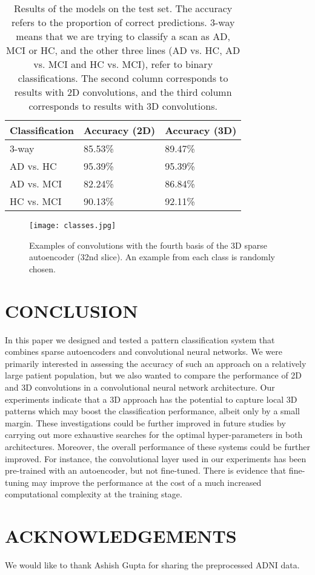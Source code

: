 \documentclass[a4paper,10pt]{article}
\begin{document}
\begin{table}[h]
\caption{Results of the models on the test set. The accuracy refers to the proportion of correct predictions. 3-way means that we are trying to classify a scan as AD, MCI or HC, and the other three lines (AD vs. HC, AD vs. MCI and HC vs. MCI), refer to binary classifications. The second column corresponds to results with 2D convolutions, and the third column corresponds to results with 3D convolutions.}
\label{tab:results} \centering
\begin{tabular}{l l l}
	\textbf{Classification} & \textbf{Accuracy (2D)} & \textbf{Accuracy (3D)} \\ \hline
	3-way & 85.53\% & 89.47\% \\
	AD vs. HC & 95.39\% & 95.39\% \\
	AD vs. MCI & 82.24\% & 86.84\% \\
	HC vs. MCI & 90.13\% & 92.11\% \\
	\hline
\end{tabular}
\end{table}
\begin{figure*}
	\centering
	\texttt{[image: classes.jpg]}
	\caption{Examples of convolutions with the fourth basis of the 3D sparse autoencoder (32nd slice). An example from each class is randomly chosen.}
\label{convolutions}
\end{figure*}

\section{\uppercase{Conclusion}}
\label{sec:conclusion}

\noindent In this paper we designed and tested a pattern classification system that combines sparse autoencoders and convolutional neural networks. We were primarily interested in assessing the accuracy of such an approach on a relatively large patient population, but we also wanted to compare the performance of 2D and 3D convolutions in a convolutional neural network architecture. Our experiments indicate that a 3D approach has the potential to capture local 3D patterns which may boost the classification performance, albeit only by a small margin. These investigations could be further improved in future studies by carrying out more exhaustive searches for the optimal hyper-parameters in both architectures. Moreover, the overall performance of these systems could be further improved. For instance, the convolutional layer used in our experiments has been pre-trained with an autoencoder, but not fine-tuned. There is evidence that fine-tuning may improve the performance \cite{jarrett} at the cost of a much increased computational complexity at the training stage.

\section*{\uppercase{Acknowledgements}}

\noindent We would like to thank Ashish Gupta for sharing the preprocessed ADNI data.

{\small
}
\end{document}
